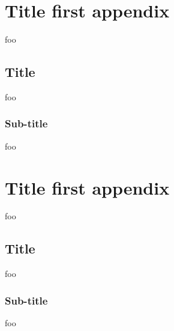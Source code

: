 \chapter{Title first appendix}

foo


\section{Title}

foo

\subsection{Sub-title}

foo


\chapter{Title first appendix}

foo

\section{Title}

foo

\subsection{Sub-title}
foo


